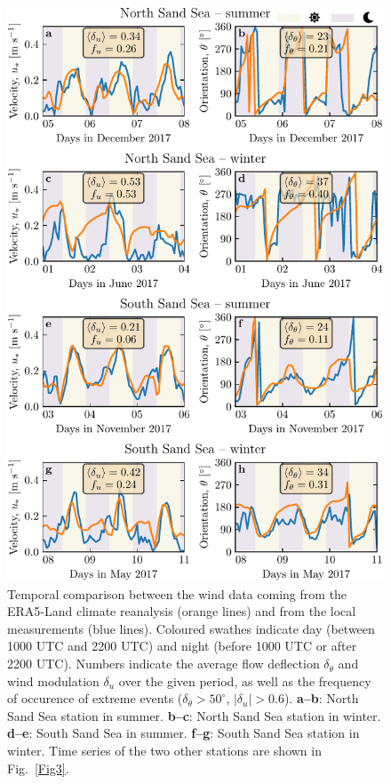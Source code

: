 \begin{figure}
\centering
\includegraphics[scale=1]{Figures/Figure5.pdf}
\caption{Temporal comparison between the wind data coming from the ERA5-Land climate reanalysis (orange lines) and from the local measurements (blue lines). Coloured swathes indicate day (between 1000 UTC and 2200 UTC) and night (before 1000 UTC or after 2200 UTC). Numbers indicate the average flow deflection $\delta_{\theta}$ and wind modulation $\delta_{u}$ over the given period, as well as the frequency of occurence of extreme events ($\delta_{\theta} > 50^\circ$, $\vert\delta_{u}\vert > 0.6$). \textbf{a--b}: North Sand Sea station in summer. \textbf{b--c}: North Sand Sea station in winter. \textbf{d--e}: South Sand Sea in summer. \textbf{f--g}: South Sand Sea station in winter. Time series of the two other stations are shown in Fig.~\ref{Fig3}.}
\label{Fig5}
\end{figure}

